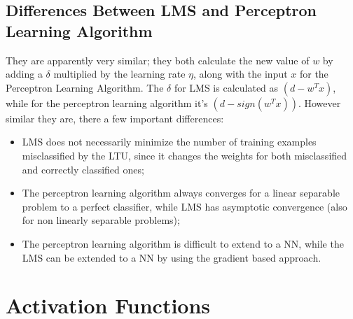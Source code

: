\subsection{Differences Between LMS and Perceptron Learning Algorithm}

They are apparently very similar; they both calculate the new value of $w$ by adding a $\delta$ multiplied by the learning rate $\eta$, along with the input $x$ for the Perceptron Learning Algorithm. The $\delta$ for LMS is calculated as $(d - w^Tx)$, while for the perceptron learning algorithm it's $(d - sign(w^Tx))$. However similar they are, there a few important differences:

\begin{itemize}
    \item LMS does not necessarily minimize the number of training examples misclassified by the LTU, since it changes the weights for both misclassified and correctly classified ones;

    \item The perceptron learning algorithm always converges for a linear separable problem to a perfect classifier, while LMS has asymptotic convergence (also for non linearly separable problems);

    \item The perceptron learning algorithm is difficult to extend to a NN, while the LMS can be extended to a NN by using the gradient based approach.
\end{itemize}

\section{Activation Functions}

